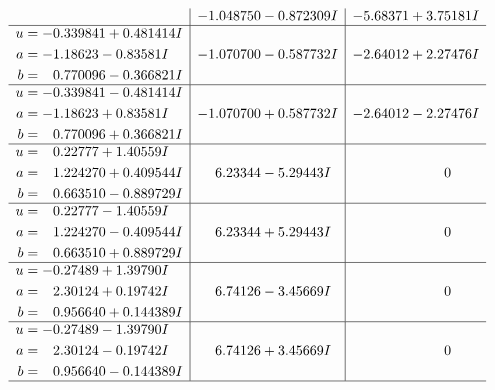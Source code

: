 \documentclass[1p]{elsarticle_modified}
\theoremstyle{definition}
\begin{document}
$$\begin{array}{c|c|c}
 & -1.048750 - 0.872309 I & -5.68371 + 3.75181 I \\ \hline\begin{aligned}
u &= -0.339841 + 0.481414 I \\
a &= -1.18623 - 0.83581 I \\
b &= \phantom{-}0.770096 - 0.366821 I\end{aligned}
 & -1.070700 - 0.587732 I & -2.64012 + 2.27476 I \\ \hline\begin{aligned}
u &= -0.339841 - 0.481414 I \\
a &= -1.18623 + 0.83581 I \\
b &= \phantom{-}0.770096 + 0.366821 I\end{aligned}
 & -1.070700 + 0.587732 I & -2.64012 - 2.27476 I \\ \hline\begin{aligned}
u &= \phantom{-}0.22777 + 1.40559 I \\
a &= \phantom{-}1.224270 + 0.409544 I \\
b &= \phantom{-}0.663510 - 0.889729 I\end{aligned}
 & \phantom{-}6.23344 - 5.29443 I & \phantom{-0.000000 } 0 \\ \hline\begin{aligned}
u &= \phantom{-}0.22777 - 1.40559 I \\
a &= \phantom{-}1.224270 - 0.409544 I \\
b &= \phantom{-}0.663510 + 0.889729 I\end{aligned}
 & \phantom{-}6.23344 + 5.29443 I & \phantom{-0.000000 } 0 \\ \hline\begin{aligned}
u &= -0.27489 + 1.39790 I \\
a &= \phantom{-}2.30124 + 0.19742 I \\
b &= \phantom{-}0.956640 + 0.144389 I\end{aligned}
 & \phantom{-}6.74126 - 3.45669 I & \phantom{-0.000000 } 0 \\ \hline\begin{aligned}
u &= -0.27489 - 1.39790 I \\
a &= \phantom{-}2.30124 - 0.19742 I \\
b &= \phantom{-}0.956640 - 0.144389 I\end{aligned}
 & \phantom{-}6.74126 + 3.45669 I & \phantom{-0.000000 } 0\\
 \hline 
 \end{array}$$\newpage$$\begin{array}{c|c|c}  

\end{array}$$
\end{document}
